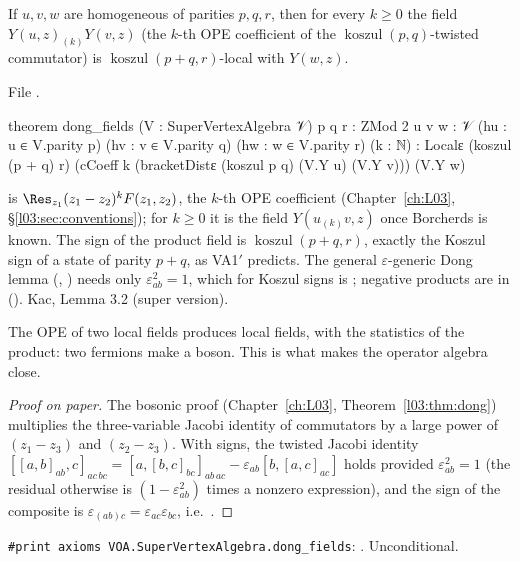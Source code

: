 \begin{theorem}\label{l17:thm:dong}
If $u,v,w$ are homogeneous of parities $p,q,r$, then for every $k\ge0$ the field
$Y(u,z)_{(k)}Y(v,z)$ (the $k$-th OPE coefficient of the $\operatorname{koszul}(p,q)$-twisted
commutator) is $\operatorname{koszul}(p+q,r)$-local with $Y(w,z)$.
\end{theorem}
\noindent File .
\begin{leancode}
theorem dong_fields (V : SuperVertexAlgebra 𝒱) {p q r : ZMod 2} {u v w : 𝒱}
    (hu : u ∈ V.parity p) (hv : v ∈ V.parity q) (hw : w ∈ V.parity r) (k : ℕ) :
    Localε (koszul (p + q) r)
      (cCoeff k (bracketDistε (koszul p q) (V.Y u) (V.Y v))) (V.Y w)
\end{leancode}
\begin{dictionary}
 is $\Res_{z_1}(z_1-z_2)^kF(z_1,z_2)$, the $k$-th OPE coefficient (Chapter~\ref{ch:L03},
§\ref{l03:sec:conventions}); for $k\ge0$ it is the field $Y(u_{(k)}v,z)$ once Borcherds is known.
The sign of the product field is $\operatorname{koszul}(p+q,r)$, exactly the Koszul sign of a state
of parity $p+q$, as VA1$'$ predicts. The general $\varepsilon$-generic Dong lemma
(, ) needs only
$\varepsilon_{ab}^2=1$, which for Koszul signs is ; negative products are in
 (). Kac, Lemma 3.2 (super version).
\end{dictionary}
\begin{physics}
The OPE of two local fields produces local fields, with the statistics of the product: two
fermions make a boson. This is what makes the operator algebra close.
\end{physics}
\begin{proof}[Proof on paper]
The bosonic proof (Chapter~\ref{ch:L03}, Theorem~\ref{l03:thm:dong}) multiplies the three-variable
Jacobi identity of commutators by a large power of $(z_1-z_3)$ and $(z_2-z_3)$. With signs, the
twisted Jacobi identity $[[a,b]_{ab},c]_{ac\,bc}=[a,[b,c]_{bc}]_{ab\,ac}-\varepsilon_{ab}[b,[a,c]_{ac}]$
holds provided $\varepsilon_{ab}^2=1$ (the residual otherwise is $(1-\varepsilon_{ab}^2)$ times a
nonzero expression), and the sign of the composite is
$\varepsilon_{(ab)c}=\varepsilon_{ac}\varepsilon_{bc}$, i.e.\ .
\end{proof}
\begin{status}
\texttt{\#print axioms VOA.SuperVertexAlgebra.dong\_fields}: . Unconditional.
\end{status}

